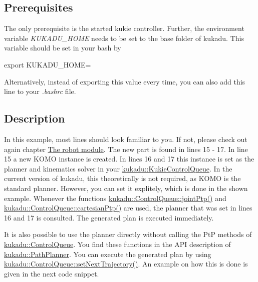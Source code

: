 \subsection*{Prerequisites}

The only prerequisite is the started kukie controller. Further, the environment variable {\itshape K\-U\-K\-A\-D\-U\-\_\-\-H\-O\-M\-E} needs to be set to the base folder of kukadu. This variable should be set in your bash by 
\begin{DoxyCode}
export KUKADU\_HOME=%
\end{DoxyCode}
 Alternatively, instead of exporting this value every time, you can also add this line to your {\itshape .bashrc} file.

\subsection*{Description}

In this example, most lines should look familiar to you. If not, please check out again chapter \hyperlink{robotpage}{The robot module}. The new part is found in lines 15 -\/ 17. In line 15 a new K\-O\-M\-O instance is created. In lines 16 and 17 this instance is set as the planner and kinematics solver in your \hyperlink{classkukadu_1_1KukieControlQueue}{kukadu\-::\-Kukie\-Control\-Queue}. In the current version of kukadu, this theoretically is not required, as K\-O\-M\-O is the standard planner. However, you can set it explitely, which is done in the shown example. Whenever the functions \hyperlink{classkukadu_1_1ControlQueue_ad11059100321b24a1af8ef7de8314353}{kukadu\-::\-Control\-Queue\-::joint\-Ptp()} and \hyperlink{classkukadu_1_1ControlQueue_a1bfa23a8ce6319f6ef0ed9208e896054}{kukadu\-::\-Control\-Queue\-::cartesian\-Ptp()} are used, the planner that was set in lines 16 and 17 is consulted. The generated plan is executed immediately.

It is also possible to use the planner directly without calling the Pt\-P methods of \hyperlink{classkukadu_1_1ControlQueue}{kukadu\-::\-Control\-Queue}. You find these functions in the A\-P\-I description of \hyperlink{classkukadu_1_1PathPlanner}{kukadu\-::\-Path\-Planner}. You can execute the generated plan by using \hyperlink{classkukadu_1_1ControlQueue_a0025c5c010a1b33d637e52fb24f767b2}{kukadu\-::\-Control\-Queue\-::set\-Next\-Trajectory()}. An example on how this is done is given in the next code snippet.


